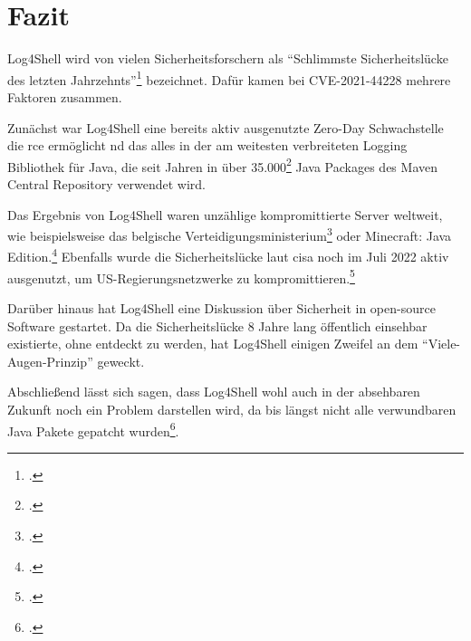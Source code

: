 
\section{Fazit}\label{sec:fazit}
Log4Shell wird von vielen Sicherheitsforschern als ``Schlimmste Sicherheitslücke des letzten Jahrzehnts''\footcite{guardianArticle} bezeichnet.
Dafür kamen bei CVE-2021-44228 mehrere Faktoren zusammen.

Zunächst war Log4Shell eine bereits aktiv ausgenutzte Zero-Day Schwachstelle die \gls{rce} ermöglicht nd das alles in der am weitesten verbreiteten Logging Bibliothek für Java, die seit Jahren in über 35.000\footcite{impact} Java Packages des Maven Central Repository verwendet wird.

\bigskip
Das Ergebnis von Log4Shell waren unzählige kompromittierte Server weltweit, wie beispielsweise das belgische Verteidigungsministerium\footcite{zdNet} oder Minecraft: Java Edition.\footcite{minecraftForum}
Ebenfalls wurde die Sicherheitslücke laut \gls{cisa} noch im Juli 2022 aktiv ausgenutzt, um US-Regierungsnetzwerke zu kompromittieren.\footcite{cisaAlert}

Darüber hinaus hat Log4Shell eine Diskussion über Sicherheit in open-source Software gestartet.
Da die Sicherheitslücke 8 Jahre lang öffentlich einsehbar existierte, ohne entdeckt zu werden, hat Log4Shell einigen Zweifel an dem ``Viele-Augen-Prinzip'' geweckt.

\bigskip
Abschließend lässt sich sagen, dass Log4Shell wohl auch in der absehbaren Zukunft noch ein Problem darstellen wird, da bis längst nicht alle verwundbaren Java Pakete gepatcht wurden\footcite{kaspersky}.